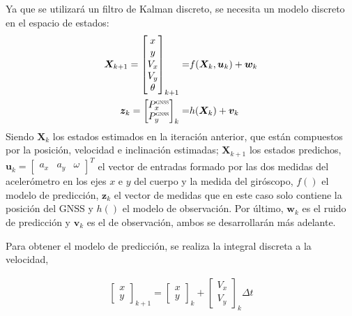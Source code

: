 Ya que se utilizará un filtro de Kalman discreto, se necesita un modelo discreto en el espacio de estados:
\begin{align}
\bm{X}_{k+1}=
\begin{bmatrix} 
x \\ y \\ V_x \\ V_y \\ \theta
\end{bmatrix}_{k+1}
=& f(\bm{X}_k,\bm{u}_k) + \bm{w}_k \\
\bm{z}_k=
\begin{bmatrix} 
P^{\scalebox{0.5}{GNSS}}_x \\ P^{\scalebox{0.5}{GNSS}}_y
\end{bmatrix}_{k}
 =& h(\bm{X}_k) + \bm{v}_k
\end{align}
Siendo $\bm{X}_{k}$ los estados estimados en la iteración anterior, que están compuestos por la posición, velocidad e inclinación estimadas; $\bm{X}_{k+1}$ los estados predichos, $\bm{u}_k=\begin{bmatrix}a_x & a_y & \omega\end{bmatrix}^T$ el vector de entradas formado por las dos medidas del acelerómetro en los ejes $x$ e $y$ del cuerpo y la medida del giróscopo, $f()$ el modelo de predicción, $\bm{z}_k$ el vector de medidas que en este caso solo contiene la posición del GNSS y $h()$ el modelo de observación. Por último, $\bm{w}_k$ es el ruido de predicción y $\bm{v}_k$ es el de observación, ambos se desarrollarán más adelante.


Para obtener el modelo de predicción, se realiza la integral discreta a la velocidad,

\begin{align}
\begin{bmatrix} 
x \\ y 
\end{bmatrix}_{k+1}
=
\begin{bmatrix} 
x \\ y 
\end{bmatrix}_k
+
\begin{bmatrix} 
V_x \\ V_y 
\end{bmatrix}_k
\Delta t
\end{align}


